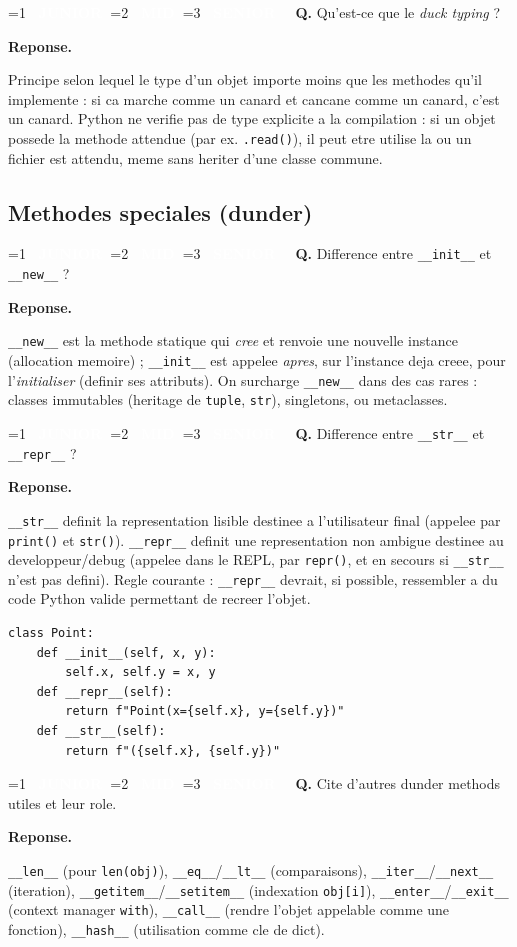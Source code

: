 \documentclass[11pt,a4paper]{article}
\newcommand{\badgeJ}{\textcolor{white}{\colorbox{junior}{\small\bfseries\ JUNIOR\ }}}
\newcommand{\badgeM}{\textcolor{white}{\colorbox{mid}{\small\bfseries\ MID\ }}}
\newcommand{\badgeS}{\textcolor{white}{\colorbox{senior}{\small\bfseries\ SENIOR\ }}}
\newcounter{qcount}
\newenvironment{qa}[2]{%
  \stepcounter{qcount}%
  \par\vspace{6pt}%
  \noindent\colorbox{qbg}{\parbox{\dimexpr\linewidth-12pt}{\vspace{2pt}%
  \ifnum#1=1 \badgeJ\fi\ifnum#1=2 \badgeM\fi\ifnum#1=3 \badgeS\fi
  \ \textbf{Q\theqcount.} #2\vspace{2pt}}}\par\vspace{4pt}%
  \noindent\textbf{\color{accent}Reponse.}\ \ignorespaces
}{%
  \par\vspace{8pt}%
}
\begin{document}
\begin{qa}{2}{Qu'est-ce que le \emph{duck typing} ?}
Principe selon lequel le type d'un objet importe moins que les methodes qu'il
implemente : \og{}si ca marche comme un canard et cancane comme un canard,
c'est un canard\fg{}. Python ne verifie pas de type explicite a la compilation
: si un objet possede la methode attendue (par ex. \texttt{.read()}), il peut
etre utilise la ou un fichier est attendu, meme sans heriter d'une classe
commune.
\end{qa}

\subsection{Methodes speciales (dunder)}

\begin{qa}{1}{Difference entre \texttt{\_\_init\_\_} et \texttt{\_\_new\_\_} ?}
\texttt{\_\_new\_\_} est la methode statique qui \emph{cree} et renvoie une
nouvelle instance (allocation memoire) ; \texttt{\_\_init\_\_} est appelee
\emph{apres}, sur l'instance deja creee, pour l'\emph{initialiser} (definir ses
attributs). On surcharge \texttt{\_\_new\_\_} dans des cas rares : classes
immutables (heritage de \texttt{tuple}, \texttt{str}), singletons, ou
metaclasses.
\end{qa}

\begin{qa}{1}{Difference entre \texttt{\_\_str\_\_} et \texttt{\_\_repr\_\_} ?}
\texttt{\_\_str\_\_} definit la representation \og{}lisible\fg{} destinee a
l'utilisateur final (appelee par \texttt{print()} et \texttt{str()}).
\texttt{\_\_repr\_\_} definit une representation \og{}non ambigue\fg{}
destinee au developpeur/debug (appelee dans le REPL, par \texttt{repr()}, et en
secours si \texttt{\_\_str\_\_} n'est pas defini). Regle courante :
\texttt{\_\_repr\_\_} devrait, si possible, ressembler a du code Python valide
permettant de recreer l'objet.
\begin{lstlisting}
class Point:
    def __init__(self, x, y):
        self.x, self.y = x, y
    def __repr__(self):
        return f"Point(x={self.x}, y={self.y})"
    def __str__(self):
        return f"({self.x}, {self.y})"
\end{lstlisting}
\end{qa}

\begin{qa}{2}{Cite d'autres dunder methods utiles et leur role.}
\texttt{\_\_len\_\_} (pour \texttt{len(obj)}), \texttt{\_\_eq\_\_}/\texttt{\_\_lt\_\_}
(comparaisons), \texttt{\_\_iter\_\_}/\texttt{\_\_next\_\_} (iteration),
\texttt{\_\_getitem\_\_}/\texttt{\_\_setitem\_\_} (indexation \texttt{obj[i]}),
\texttt{\_\_enter\_\_}/\texttt{\_\_exit\_\_} (context manager \texttt{with}),
\texttt{\_\_call\_\_} (rendre l'objet appelable comme une fonction),
\texttt{\_\_hash\_\_} (utilisation comme cle de dict).
\end{qa}
\end{document}
